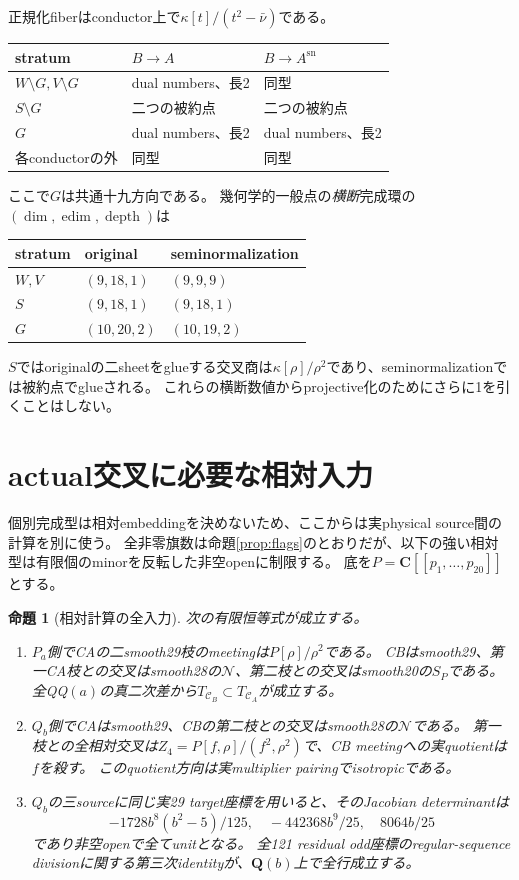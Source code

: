 \documentclass[11pt,a4paper]{ltjsarticle}
\newcommand{\CC}{\mathbf C}
\newcommand{\QQ}{\mathbf Q}
\newcommand{\CA}{\mathcal C_A}
\newcommand{\CB}{\mathcal C_B}
\newcommand{\cN}{\mathcal N}
\newcommand{\sn}{\mathrm{sn}}
\newcommand{\edim}{\operatorname{edim}}
\newcommand{\depth}{\operatorname{depth}}
\newtheorem{proposition}[theorem]{命題}
\theoremstyle{definition}
\theoremstyle{remark}
\begin{document}
正規化fiberはconductor上で$\kappa[t]/(t^2-\bar\nu)$である。
\begin{center}
\begin{tabular}{lll}\toprule
stratum & $B\to A$ & $B\to A^{\sn}$\\\midrule
$W\setminus G,V\setminus G$ & dual numbers、長2 & 同型\\
$S\setminus G$ & 二つの被約点 & 二つの被約点\\
$G$ & dual numbers、長2 & dual numbers、長2\\
各conductorの外 & 同型 & 同型\\\bottomrule
\end{tabular}
\end{center}
ここで$G$は共通十九方向である。
幾何学的一般点の\emph{横断}完成環の$(\dim,\edim,\depth)$は
\begin{center}
\begin{tabular}{lll}\toprule
stratum & original & seminormalization\\\midrule
$W,V$ & $(9,18,1)$ & $(9,9,9)$\\
$S$ & $(9,18,1)$ & $(9,18,1)$\\
$G$ & $(10,20,2)$ & $(10,19,2)$\\\bottomrule
\end{tabular}
\end{center}
$S$ではoriginalの二sheetをglueする交叉商は$\kappa[\rho]/\rho^2$であり、seminormalizationでは被約点でglueされる。
これらの横断数値からprojective化のためにさらに1を引くことはしない。

\section{actual交叉に必要な相対入力}

個別完成型は相対embeddingを決めないため、ここからは実physical source間の計算を別に使う。
全非零旗数は命題\ref{prop:flags}のとおりだが、以下の強い相対型は有限個のminorを反転した非空openに制限する。
底を$P=\CC[[p_1,\ldots,p_{20}]]$とする。

\begin{proposition}[相対計算の全入力]\label{prop:relative}
次の有限恒等式が成立する。
\begin{enumerate}
\item $P_a$側でCAの二smooth29枝のmeetingは$P[\rho]/\rho^2$である。
CBはsmooth29、第一CA枝との交叉はsmooth28の$\cN$、第二枝との交叉はsmooth20の$S_P$である。
全QQ$(a)$の真二次差から$T_{\CB}\subset T_{\CA}$が成立する。
\item $Q_b$側でCAはsmooth29、CBの第二枝との交叉はsmooth28の$\cN$である。
第一枝との全相対交叉は$Z_4=P[f,\rho]/(f^2,\rho^2)$で、CB meetingへの実quotientは$f$を殺す。
このquotient方向は実multiplier pairingでisotropicである。
\item $Q_b$の三sourceに同じ実29 target座標を用いると、そのJacobian determinantは
\[
 -1728b^8(b^2-5)/125,\quad-442368b^9/25,\quad8064b/25
\]
であり非空openで全てunitとなる。
全121 residual odd座標のregular-sequence divisionに関する第三次identityが、$\QQ(b)$上で全行成立する。
\end{enumerate}
\end{proposition}
\end{document}
